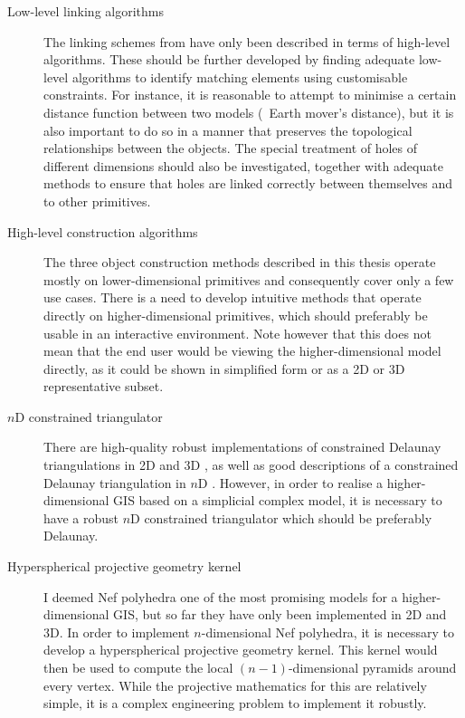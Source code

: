 \begin{description}

\item[Low-level linking algorithms] The linking schemes from  have only been described in terms of high-level algorithms.
These should be further developed by finding adequate low-level algorithms to identify matching elements using customisable constraints.
For instance, it is reasonable to attempt to minimise a certain distance function between two models (\eg\ Earth mover's distance), but it is also important to do so in a manner that preserves the topological relationships between the objects.
The special treatment of holes of different dimensions should also be investigated, together with adequate methods to ensure that holes are linked correctly between themselves and to other primitives.

\item[High-level construction algorithms] The three object construction methods described in this thesis operate mostly on lower-dimensional primitives and consequently cover only a few use cases.
There is a need to develop intuitive methods that operate directly on higher-dimensional primitives, which should preferably be usable in an interactive environment.
Note however that this does not mean that the end user would be viewing the higher-dimensional model directly, as it could be shown in simplified form or as a 2D or 3D representative subset.

\item[$n$D constrained triangulator] There are high-quality robust implementations of constrained Delaunay triangulations in 2D \citep{Shewchuk96} and 3D \citep{Si05}, as well as good descriptions of a constrained Delaunay triangulation in $n$D \citep{Shewchuk07}.
However, in order to realise a higher-dimensional GIS based on a simplicial complex model, it is necessary to have a robust $n$D constrained triangulator which should be preferably Delaunay.

\item[Hyperspherical projective geometry kernel] I deemed Nef polyhedra one of the most promising models for a higher-dimensional GIS, but so far they have only been implemented in 2D and 3D.\@
In order to implement $n$-dimensional Nef polyhedra, it is necessary to develop a hyperspherical projective geometry kernel.
This kernel would then be used to compute the local $(n-1)$-dimensional pyramids around every vertex.
While the projective mathematics for this are relatively simple, it is a complex engineering problem to implement it robustly.


\end{description}
